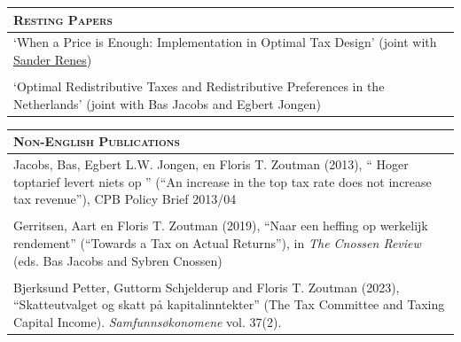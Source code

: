 \documentclass [11pt]{article}
\newcommand{\kiss}
{\vspace{0.5cm}}
\newcommand{\thickrule}{\toprule}
\newcommand{\ttitle}[1]{\scshape{\Large {#1}}}
\begin{document}
\begin{tabular}[t] { p{16.75cm}  }
\ttitle{Resting Papers}
\\
\thickrule

`When a Price is Enough: Implementation in Optimal Tax Design' (joint with \href{http://sanderrenes.com/}{Sander Renes})
\\
\\
`Optimal Redistributive Taxes and Redistributive Preferences in the Netherlands' (joint with Bas Jacobs and Egbert Jongen)
\end{tabular}


\kiss



\begin{tabular}[t] { p{16.75cm}  }
\ttitle{Non-English Publications}
\\
\thickrule
Jacobs, Bas, Egbert L.W. Jongen, en Floris T. Zoutman (2013), `` Hoger toptarief levert niets op '' (``An increase in the top tax rate does not increase tax revenue''), CPB Policy Brief 2013/04 
\\
\\
Gerritsen, Aart en Floris T. Zoutman (2019), ``Naar een heffing op werkelijk rendement'' (``Towards a Tax on Actual Returns''), in \emph{The Cnossen Review} (eds. Bas Jacobs and Sybren Cnossen)
\\
\\
Bjerksund Petter, Guttorm Schjelderup and Floris T. Zoutman (2023), ``Skatteutvalget og skatt på kapitalinntekter'' (The Tax Committee and Taxing Capital Income). \emph{Samfunnsøkonomene} vol. 37(2).

\end{tabular}

\kiss
\end{document}
